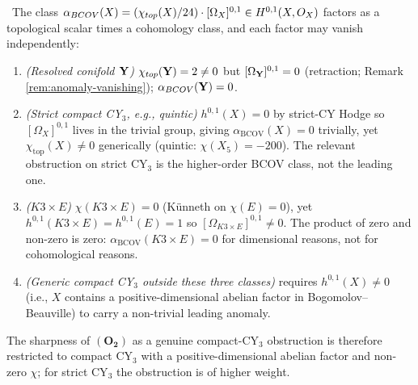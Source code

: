 \begin{lemma}
\label{lem:chi-top-bcov-split}
\ClaimStatusProposition\
The class $\alpha_{BCOV}(X) = (\chi_{top}(X)/24)
\cdot [\Omega_X]^{0,1} \in H^{0,1}(X, O_X)$ factors as a
topological scalar times a cohomology class, and each factor may
vanish independently:
\begin{enumerate}[leftmargin=2em]
\item \emph{(Resolved conifold $\mathbf{Y}$)} $\chi_{top}(\mathbf{Y}) = 2
  \neq 0$ but $[\Omega_{\mathbf{Y}}]^{0,1} = 0$ (retraction; Remark
  \ref{rem:anomaly-vanishing}); $\alpha_{BCOV}(\mathbf{Y}) = 0$.
\item \emph{(Strict compact CY$_3$, e.g., quintic)}
  $h^{0,1}(X) = 0$ by strict-CY Hodge so $[\Omega_X]^{0,1}$ lives in
  the trivial group, giving $\alpha_{\mathrm{BCOV}}(X) = 0$
  trivially, yet $\chi_{\mathrm{top}}(X) \neq 0$ generically (quintic:
  $\chi(X_5) = -200$). The relevant obstruction on strict CY$_3$ is
  the higher-order BCOV class, not the leading one.
\item \emph{($K3 \times E$)} $\chi(K3 \times E) = 0$ (Künneth on
  $\chi(E) = 0$), yet $h^{0,1}(K3 \times E) = h^{0,1}(E) = 1$ so
  $[\Omega_{K3 \times E}]^{0,1} \neq 0$. The product of zero and
  non-zero is zero: $\alpha_{\mathrm{BCOV}}(K3 \times E) = 0$ for
  dimensional reasons, not for cohomological reasons.
\item \emph{(Generic compact CY$_3$ outside these three classes)}
  requires $h^{0,1}(X) \neq 0$ (i.e., $X$ contains a
  positive-dimensional abelian factor in Bogomolov--Beauville) to
  carry a non-trivial leading anomaly.
\end{enumerate}
The sharpness of $(\mathbf{O_2})$ as a genuine compact-CY$_3$
obstruction is therefore restricted to compact CY$_3$ with a
positive-dimensional abelian factor and non-zero $\chi$; for strict
CY$_3$ the obstruction is of higher weight.
\end{lemma}

